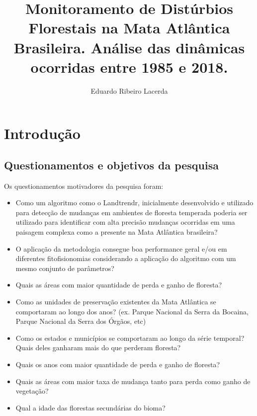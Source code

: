 \documentclass[12pt,a4paper]{article}
\title{Monitoramento de Distúrbios Florestais na Mata Atlântica Brasileira. Análise das dinâmicas ocorridas entre 1985 e 2018.}
\author{Eduardo Ribeiro Lacerda}
\date{}
\begin{document}
\maketitle

\newpage
\tableofcontents

\newpage
\listoffigures

\newpage

\section{Introdução}

\subsection{Questionamentos e objetivos da pesquisa}
Os questionamentos motivadores da pesquisa foram:
\begin{itemize}
    \item Como um algoritmo como o Landtrendr, inicialmente desenvolvido e utilizado para detecção de mudanças em ambientes de floresta temperada poderia ser utilizado para identificar com alta precisão mudanças ocorridas em uma paisagem complexa como a presente na Mata Atlântica brasileira?
    
    \item O aplicação da metodologia consegue boa performance geral e/ou em diferentes fitofisionomias considerando a aplicação do algoritmo com um mesmo conjunto de parâmetros?
    
    \item Quais as áreas com maior quantidade de perda e ganho de floresta?
    
    \item Como as unidades de preservação existentes da Mata Atlântica se comportaram ao longo dos anos? (ex. Parque Nacional da Serra da Bocaina, Parque Nacional da Serra dos Órgãos, etc)
    
    \item Como os estados e municípios se comportaram ao longo da série temporal? Quais deles ganharam mais do que perderam floresta?
    
    \item Quais os anos com maior quantidade de perda e ganho de floresta?
    
    \item Quais as áreas com maior taxa de mudança tanto para perda como ganho de vegetação? 
    
    \item Qual a idade das florestas secundárias do bioma? 
\end{itemize}
\end{document}
